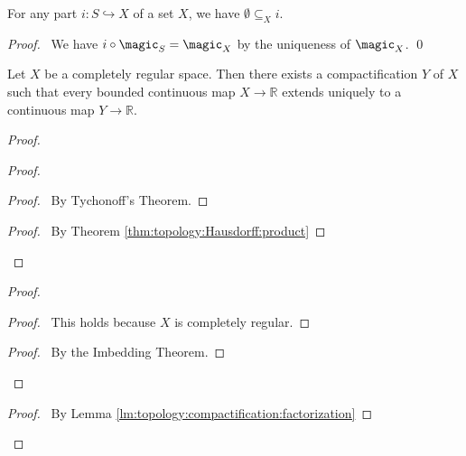 \begin{prop}
For any part $i : S \hookrightarrow X$ of a set $X$, we have $\emptyset \subseteq_X i$.
\end{prop}

\begin{proof}
\pf\ We have $i \circ \magic_S = \magic_X$ by the uniqueness of $\magic_X$. \qed
\end{proof}

\begin{thm}
Let $X$ be a completely regular space. Then there exists a compactification $Y$ of $X$ such that every bounded continuous map $X \rightarrow \mathbb{R}$
extends uniquely to a continuous map $Y \rightarrow \mathbb{R}$.
\end{thm}

\begin{proof}
\pf
{}
\begin{proof}
  \begin{proof}
    \pf\ By Tychonoff's Theorem.
  \end{proof}
  \begin{proof}
    \pf\ By Theorem \ref{thm:topology:Hausdorff:product}
  \end{proof}
\end{proof}
\begin{proof}
  \begin{proof}
    \pf\ This holds because $X$ is completely regular.
  \end{proof}
  \qedstep
  \begin{proof}
    \pf\ By the Imbedding Theorem.
  \end{proof}
\end{proof}
\begin{proof}
  \pf\ By Lemma \ref{lm:topology:compactification:factorization}
\end{proof}

\end{proof}
